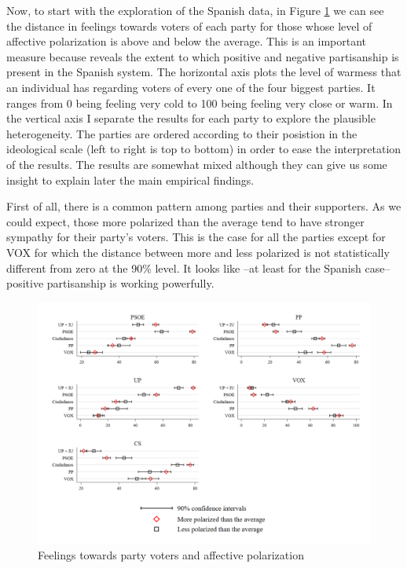 \documentclass[a4paper, svgnames]{article}
\begin{document}
Now, to start with the exploration of the Spanish data, in Figure \ref*{fig:feelings} we can see the distance in feelings towards voters of each party for those whose level of affective polarization is above and below the average. This is an important measure because reveals the extent to which positive and negative partisanship is present in the Spanish system. The horizontal axis plots the level of warmess that an individual has regarding voters of every one of the four biggest parties. It ranges from 0 being feeling very cold to 100 being feeling very close or warm. In the vertical axis I separate the results for each party to explore the plausible heterogeneity. The parties are ordered according to their posistion in the ideological scale (left to right is top to bottom) in order to ease the interpretation of the results. The results are somewhat mixed although they can give us some insight to explain later the main empirical findings.

First of all, there is a common pattern among parties and their supporters. As we could expect, those more polarized than the average tend to have stronger sympathy for their party's voters. This is the case for all the parties except for VOX for which the distance between more and less polarized is not statistically different from zero at the 90\% level. It looks like --at least for the Spanish case-- positive partisanship is working powerfully.

\begin{figure}[H]
	\centering
	\includegraphics[scale=0.35]{Figures/combinedfeelingsAP.png}
	\caption{\label{fig:feelings} Feelings towards party voters and affective polarization}
\end{figure}
\end{document}
